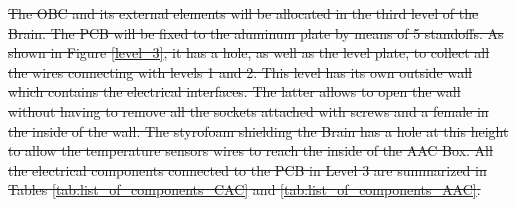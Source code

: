 \documentclass[a4paper,12pt,twoside]{article}
\providecommand{\DIFdeltex}[1]{{\protect\color{red}\sout{#1}}}                      %
\providecommand{\DIFdel}[1]{\texorpdfstring{\DIFdeltex{#1}}{}} %
\begin{document}
\DIFdel{The OBC and its external elements will be allocated in the third level of the Brain. The PCB will be fixed to the aluminum plate by means of 5 standoffs. As shown in Figure \ref{level_3}, it has a hole, as well as the level plate, to collect all the wires connecting with levels 1 and 2. This level has its own outside wall which contains the electrical interfaces. The latter allows to open the wall without having to remove all the sockets attached with screws and a female in the inside of the wall. The styrofoam shielding the Brain has a hole at this height to allow the temperature sensors wires to reach the inside of the AAC Box. All the electrical components connected to the PCB in Level 3 are summarized in Tables \ref{tab:list_of_components_CAC} and \ref{tab:list_of_components_AAC}.
}%

\end{document}
